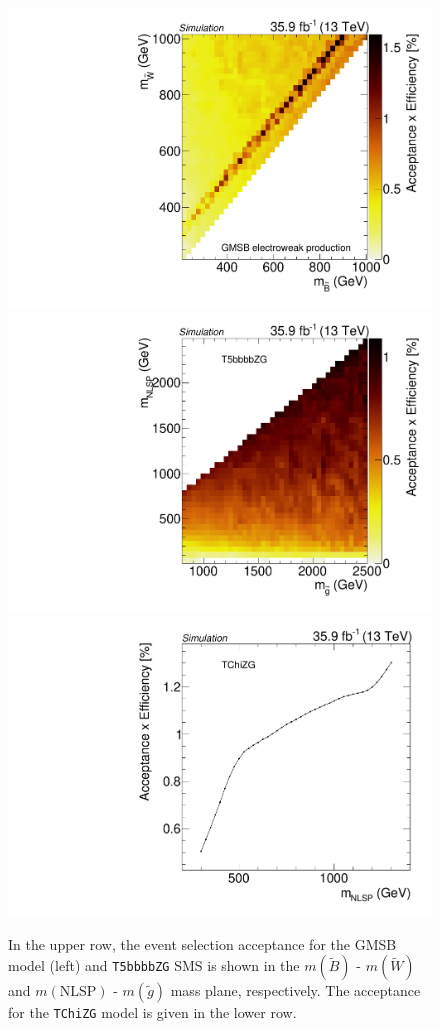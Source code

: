 \begin{figure}
 \includegraphics[width=\pairwidth]{figures/acceptance/gmsb}
 \includegraphics[width=\pairwidth]{figures/acceptance/t5zg}
 \includegraphics[width=\pairwidth]{figures/acceptance/tching}
 \caption{In the upper row, the event selection acceptance for the GMSB model (left) and \texttt{T5bbbbZG} SMS is shown in the $m(\widetilde{B})$ - $m(\widetilde{W})$ and $m(\mathrm{NLSP})$ - $m(\tilde{g})$ mass plane, respectively. The acceptance for the \texttt{TChiZG} model is given in the lower row.}
 \label{fig:app_acceptance}
\end{figure}
\FloatBarrier

